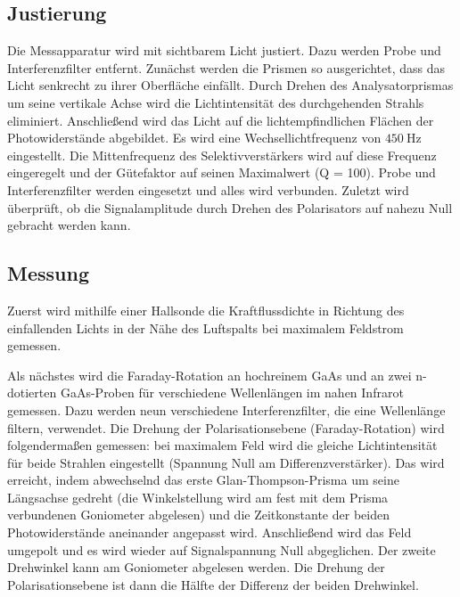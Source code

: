\subsection{Justierung}
Die Messapparatur wird mit sichtbarem Licht justiert. Dazu werden Probe und Interferenzfilter entfernt.
Zunächst werden die Prismen so ausgerichtet, dass das Licht senkrecht zu ihrer Oberfläche einfällt. Durch Drehen des Analysatorprismas um seine vertikale Achse wird die Lichtintensität des durchgehenden Strahls eliminiert.
Anschließend wird das Licht auf die lichtempfindlichen Flächen der Photowiderstände abgebildet.
Es wird eine Wechsellichtfrequenz von $\SI{450}{\hertz}$ eingestellt. Die Mittenfrequenz des Selektivverstärkers wird auf diese Frequenz eingeregelt und der Gütefaktor auf seinen Maximalwert (Q = 100).
Probe und Interferenzfilter werden eingesetzt und alles wird verbunden. Zuletzt wird überprüft, ob die Signalamplitude durch Drehen des Polarisators auf nahezu Null gebracht werden kann.

\subsection{Messung}
Zuerst wird mithilfe einer Hallsonde die Kraftflussdichte in Richtung des einfallenden Lichts in der Nähe des Luftspalts bei maximalem Feldstrom gemessen.

Als nächstes wird die Faraday-Rotation an hochreinem GaAs und an zwei n-dotierten GaAs-Proben für verschiedene Wellenlängen im nahen Infrarot gemessen. Dazu werden neun verschiedene Interferenzfilter, die eine Wellenlänge filtern, verwendet.
Die Drehung der Polarisationsebene (Faraday-Rotation) wird folgendermaßen gemessen: bei maximalem Feld wird die gleiche Lichtintensität für beide Strahlen eingestellt (Spannung Null am Differenzverstärker). Das wird erreicht, indem abwechselnd das erste Glan-Thompson-Prisma um seine Längsachse gedreht (die Winkelstellung wird am fest mit dem Prisma verbundenen Goniometer abgelesen) und die Zeitkonstante der beiden Photowiderstände aneinander angepasst wird. Anschließend wird das Feld umgepolt und es wird wieder auf Signalspannung Null abgeglichen. Der zweite Drehwinkel kann am Goniometer abgelesen werden. Die Drehung der Polarisationsebene ist dann die Hälfte der Differenz der beiden Drehwinkel.